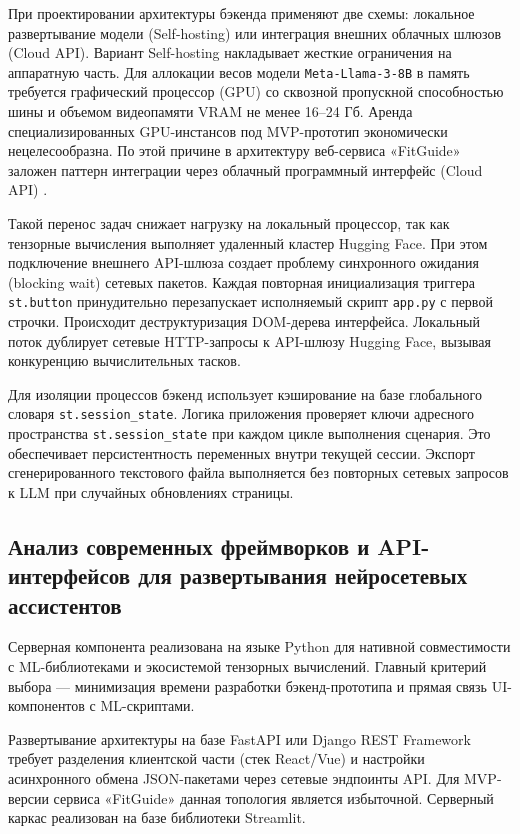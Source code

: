 \documentclass[14pt, a4paper]{extarticle}
\begin{document}
При проектировании архитектуры бэкенда применяют две схемы: локальное развертывание модели (Self-hosting) или интеграция внешних облачных шлюзов (Cloud API). Вариант Self-hosting накладывает жесткие ограничения на аппаратную часть. Для аллокации весов модели \texttt{Meta-Llama-3-8B} в память требуется графический процессор (GPU) со сквозной пропускной способностью шины и объемом видеопамяти VRAM не менее 16--24 Гб. Аренда специализированных GPU-инстансов под MVP-прототип экономически нецелесообразна. По этой причине в архитектуру веб-сервиса «FitGuide» заложен паттерн интеграции через облачный программный интерфейс (Cloud API) \cite{rest_api,http_spec}.

Такой перенос задач снижает нагрузку на локальный процессор, так как тензорные вычисления выполняет удаленный кластер Hugging Face. При этом подключение внешнего API-шлюза создает проблему синхронного ожидания (blocking wait) сетевых пакетов. Каждая повторная инициализация триггера \texttt{st.button} принудительно перезапускает исполняемый скрипт \texttt{app.py} с первой строчки. Происходит деструктуризация DOM-дерева интерфейса. Локальный поток дублирует сетевые HTTP-запросы \cite{http_spec} к API-шлюзу Hugging Face, вызывая конкуренцию вычислительных тасков.

Для изоляции процессов бэкенд использует кэширование на базе глобального словаря \texttt{st.session\_state}. Логика приложения проверяет ключи адресного пространства \texttt{st.session\_state} при каждом цикле выполнения сценария. Это обеспечивает персистентность переменных внутри текущей сессии. Экспорт сгенерированного текстового файла выполняется без повторных сетевых запросов к LLM при случайных обновлениях страницы.

\subsection{Анализ современных фреймворков и API-интерфейсов для развертывания нейросетевых ассистентов}

Серверная компонента реализована на языке Python\cite{python} для нативной совместимости с ML-библиотеками и экосистемой тензорных вычислений. Главный критерий выбора --- минимизация времени разработки бэкенд-прототипа и прямая связь UI-компонентов с ML-скриптами.

Развертывание архитектуры на базе FastAPI или Django REST Framework требует разделения клиентской части (стек React/Vue) и настройки асинхронного обмена JSON-пакетами через сетевые эндпоинты API. Для MVP-версии сервиса «FitGuide» данная топология является избыточной. Серверный каркас реализован на базе библиотеки Streamlit\cite{streamlit_doc}.
\end{document}
